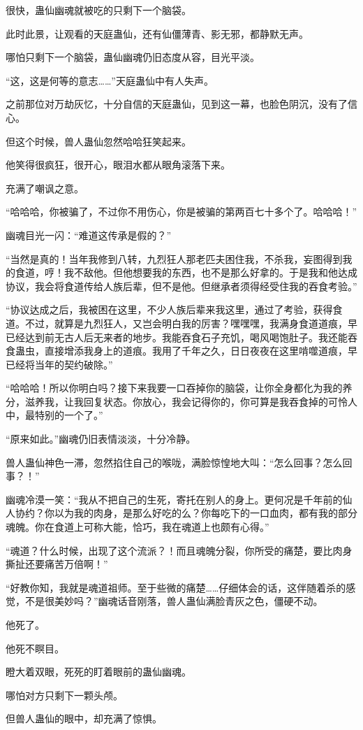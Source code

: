 \begin{this_body}
很快，蛊仙幽魂就被吃的只剩下一个脑袋。

此时此景，让观看的天庭蛊仙，还有仙僵薄青、影无邪，都静默无声。

哪怕只剩下一个脑袋，蛊仙幽魂仍旧态度从容，目光平淡。

“这，这是何等的意志……”天庭蛊仙中有人失声。

之前那位对万劫灰忆，十分自信的天庭蛊仙，见到这一幕，也脸色阴沉，没有了信心。

但这个时候，兽人蛊仙忽然哈哈狂笑起来。

他笑得很疯狂，很开心，眼泪水都从眼角滚落下来。

充满了嘲讽之意。

“哈哈哈，你被骗了，不过你不用伤心，你是被骗的第两百七十多个了。哈哈哈！”

幽魂目光一闪：“难道这传承是假的？”

“当然是真的！当年我修到八转，九烈狂人那老匹夫困住我，不杀我，妄图得到我的食道，哼！我不敌他。但他想要我的东西，也不是那么好拿的。于是我和他达成协议，我会将食道传给人族后辈，但不是他。但继承者须得经受住我的吞食考验。”

“协议达成之后，我被困在这里，不少人族后辈来我这里，通过了考验，获得食道。不过，就算是九烈狂人，又岂会明白我的厉害？嘿嘿嘿，我满身食道道痕，早已经达到前无古人后无来者的地步。我能吞食石子充饥，喝风喝饱肚子。我还能吞食蛊虫，直接增添我身上的道痕。我用了千年之久，日日夜夜在这里啃噬道痕，早已经将当年的契约破除。”

“哈哈哈！所以你明白吗？接下来我要一口吞掉你的脑袋，让你全身都化为我的养分，滋养我，让我回复状态。你放心，我会记得你的，你可算是我吞食掉的可怜人中，最特别的一个了。”

“原来如此。”幽魂仍旧表情淡淡，十分冷静。

兽人蛊仙神色一滞，忽然掐住自己的喉咙，满脸惊惶地大叫：“怎么回事？怎么回事？！”

幽魂冷漠一笑：“我从不把自己的生死，寄托在别人的身上。更何况是千年前的仙人协约？你以为我的肉身，是那么好吃的么？你每吃下的一口血肉，都有我的部分魂魄。你在食道上可称大能，恰巧，我在魂道上也颇有心得。”

“魂道？什么时候，出现了这个流派？！而且魂魄分裂，你所受的痛楚，要比肉身撕扯还要痛苦万倍啊！”

“好教你知，我就是魂道祖师。至于些微的痛楚……仔细体会的话，这伴随着杀的感觉，不是很美妙吗？”幽魂话音刚落，兽人蛊仙满脸青灰之色，僵硬不动。

他死了。

他死不瞑目。

瞪大着双眼，死死的盯着眼前的蛊仙幽魂。

哪怕对方只剩下一颗头颅。

但兽人蛊仙的眼中，却充满了惊惧。

\end{this_body}

